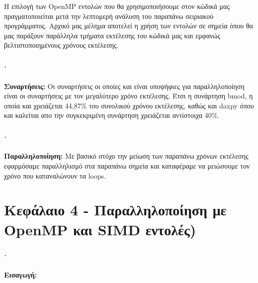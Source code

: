 \documentclass[greek,booktabs,8pt,flagBlueCMYK]{report}
\begin{document}
Η επιλογή των OpenMP εντολών που θα χρησιμοποιήσουμε στον κώδικά μας πραγματοποιείται μετά την λεπτομερή ανάλυση του παραπάνω σειριακού προγράμματος.
Αρχικό μας μέλημα αποτελεί η χρήση των εντολών σε σημεία όπου θα μας παράξουν παράλληλα τμήματα εκτέλεσης του κώδικά μας και εμφανώς βελτιστοποιημένους χρόνους εκτέλεσης.

\paragraph{.} \textbf{Συναρτήσεις:}\newline
Οι συναρτήσεις οι οποίες και είναι υποψήφιες για παραλληλοποίηση είναι οι συναρτήσεις με τον μεγαλύτερο χρόνο εκτέλεσης. Έτσι η συνάρτηση bmod, 
η οποία και χρειάζεται 44,87\% του συνολικού χρόνου εκτέλεσης, καθώς και daxpy όπου και καλείται απο την συγκεκριμένη συνάρτηση χρειάζεται αντίστοιχα 40\%. 


\paragraph{.} \textbf{Παραλληλοποίηση:}\newline
Με βασικό στόχο την μείωση των παραπάνω χρόνων εκτέλεσης εφαρμόσαμε παραλληλισμό στα παραπάνω σημεία και καταφέραμε να μειώσουμε τον χρόνο που καταναλώνουν τα loops.

\chapter{Κεφάλαιο 4 - Παραλληλοποίηση με OpenMP και SIMD εντολές)}
\paragraph{.} \textbf{Εισαγωγή:}\newline
\end{document}
